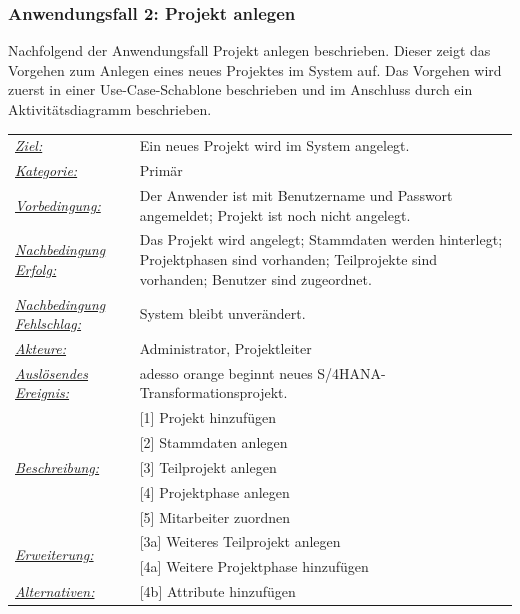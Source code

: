 \newpage
\subsubsection{Anwendungsfall 2: Projekt anlegen}
Nachfolgend der Anwendungsfall \glqq{}Projekt anlegen\grqq{} beschrieben. Dieser zeigt das Vorgehen zum Anlegen eines neues Projektes im System auf. Das Vorgehen wird zuerst in einer Use-Case-Schablone beschrieben und im Anschluss durch ein Aktivitätsdiagramm beschrieben.

\begin{table}
    \begin{tabular}[h]{l|l}
        \underline{\emph{Ziel:}} & Ein neues Projekt wird im System angelegt.\\
        \underline{\emph{Kategorie:}} & Primär\\
        \underline{\emph{Vorbedingung:}} & Der Anwender ist mit Benutzername und Passwort angemeldet; Projekt ist noch nicht angelegt.\\
        \underline{\emph{Nachbedingung Erfolg:}} & Das Projekt wird angelegt; Stammdaten werden hinterlegt; Projektphasen sind vorhanden; Teilprojekte sind vorhanden; Benutzer sind zugeordnet.\\
        \underline{\emph{Nachbedingung Fehlschlag:}} & System bleibt unverändert.\\
        \underline{\emph{Akteure:}} & Administrator, Projektleiter\\
        \underline{\emph{Auslösendes Ereignis:}} & adesso orange beginnt neues S/4HANA-Transformationsprojekt.\\
        \multirow{5}{2em}{\underline{\emph{Beschreibung:}}} & [1] Projekt hinzufügen\\ 
        & [2] Stammdaten anlegen\\ 
        & [3] Teilprojekt anlegen\\ 
        & [4] Projektphase anlegen\\ 
        & [5] Mitarbeiter zuordnen\\
        \multirow{2}{4em}{\underline{\emph{Erweiterung:}}} & [3a] Weiteres Teilprojekt anlegen\\ 
        & [4a] Weitere Projektphase hinzufügen\\
        \underline{\emph{Alternativen:}} & [4b] Attribute hinzufügen
    \end{tabular}
\end{table}

